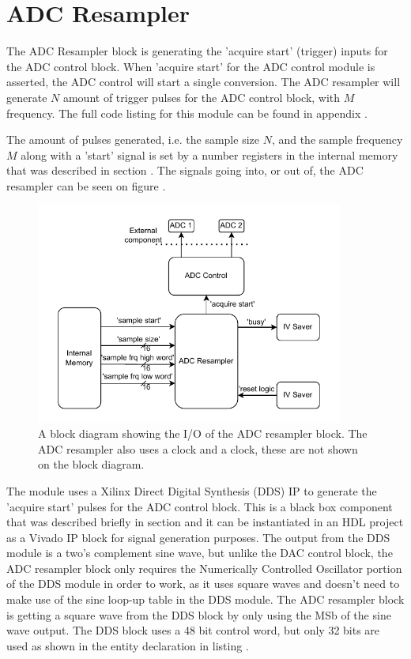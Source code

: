 \section{ADC Resampler} \label{subsec:ADCResampler}
The ADC Resampler block is generating the 'acquire start' (trigger) inputs for the ADC control block. When 'acquire start' for the ADC control module is asserted, the ADC control will start a single conversion. The ADC resampler will generate $N$ amount of trigger pulses for the ADC control block, with $M$ frequency. The full code listing for this module can be found in appendix .

The amount of pulses generated, i.e. the sample size $N$, and the sample frequency $M$ along with a 'start' signal is set by a number registers in the internal memory that was described in section . The signals going into, or out of, the ADC resampler can be seen on figure .

\begin{figure}[H]
    \centering
    \includegraphics[clip, trim=0 0 0 0, width=0.9\textwidth]{Sections/7_SystemDesign/Figures/7_2_10_Resample_IO.pdf}
    \caption{A block diagram showing the I/O of the ADC resampler block. The ADC resampler also uses a  clock and a  clock, these are not shown on the block diagram.}
    \label{fig:7_2_10_RESAMPLE_IO}
\end{figure}

The module uses a Xilinx Direct Digital Synthesis (DDS) IP\cite{XILINXDDS} to generate the 'acquire start' pulses for the ADC control block. This is a black box component that was described briefly in section  and it can be instantiated in an HDL project as a Vivado IP block for signal generation purposes. The output from the DDS module is a two's complement sine wave, but unlike the DAC control block, the ADC resampler block only requires the Numerically Controlled Oscillator portion of the DDS module in order to work, as it uses square waves and doesn't need to make use of the sine loop-up table in the DDS module. The ADC resampler block is getting a square wave from the DDS block by only using the MSb of the sine wave output. The DDS block uses a 48 bit control word, but only 32 bits are used as shown in the entity declaration in listing .

